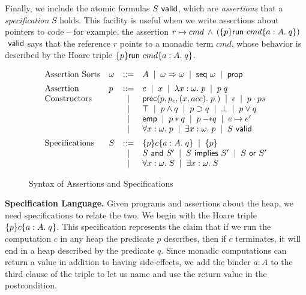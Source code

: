 \documentclass[preprint,natbib]{sigplanconf}
\begin{document}
Finally, we include the atomic formulas ${S}\mbox{\textsf{{ valid}}}$, which are
\emph{assertions} that a \emph{specification} $S$ holds. This facility
is useful when we write assertions about pointers to code -- for
example, the assertion $r \mapsto cmd$ $\land$
$(\{{p}\}{\mbox{\textsf{{run }}}{cmd}}\{{a:A}.\;{q}\})$ $\mbox{\textsf{{ valid}}}$ says that the reference $r$
points to a monadic term $cmd$, whose behavior is described by the
Hoare triple $\{{p}\}{\mbox{\textsf{{run }}}{cmd}}\{{a:A}.\;{q}\}$.

\begin{figure}
\begin{displaymath}
\begin{array}{llcl}
\mbox{Assertion Sorts} & 
\omega & ::= & A \;\;|\;\; \omega \Rightarrow \omega \;\;|\;\; \mbox{\textsf{{seq }}}{\omega} 
               \;\;|\;\; \mbox{\textsf{{prop}}} 
\\[0.5em]
\mbox{Assertion} & 
p & ::= & e \;\;|\;\; x \;\;|\;\; \lambda x:\omega.\;p \;\;|\;\; p\;q \\
\mbox{Constructors}& &  |  & \mbox{\textsf{{prec}}}(p, {p_{\epsilon}}, (x,acc).\; {p_\cdot}) 
                             \;\;|\;\; \epsilon \;\;|\;\; p \cdot ps \\ 
& &  |  & \top \;\;|\;\; p \land q \;\;|\;\; p \supset q 
          \;\;|\;\; \bot \;\;|\;\; p \vee q \\
& &  |  &  \mathsf{emp} \;\;|\;\; p * q \;\;|\;\; p -\!\!* q \;\;|\;\; e \mapsto e' \\
& &  |  & \forall x:\omega.\; p \;\;|\;\; \exists x:\omega.\; p \;\;|\;\;
          {S}\mbox{\textsf{{ valid}}} 
\\[0.5em]
\mbox{Specifications} &
S & ::= & \{{p}\}{c}\{{a:A}.\;{q}\} \;\;|\;\; \{{p}\} \\
& &  |  & S \mbox{\textsf{{ and }}} S' \;\;|\;\; S \mbox{\textsf{{ implies }}} S' \;\;|\;\; S \mbox{\textsf{{ or }}} S' \\
& &  |  & \forall x:\omega.\; S \;\;|\;\; \exists x:\omega.\;S 
\\
\end{array}
\end{displaymath}
\caption{Syntax of Assertions and Specifications}
\label{assert-syntax}
\end{figure}
\textbf{Specification Language.} Given programs and assertions about
the heap, we need specifications to relate the two. We begin with the
Hoare triple $\{{p}\}{c}\{{a:A}.\;{q}\}$. This specification represents the
claim that if we run the computation $c$ in any heap the predicate $p$
describes, then if $c$ terminates, it will end in a heap described by
the predicate $q$. Since monadic computations can return a value in
addition to having side-effects, we add the binder $a:A$ to the third
clause of the triple to let us name and use the return value in the
postcondition.
\end{document}
